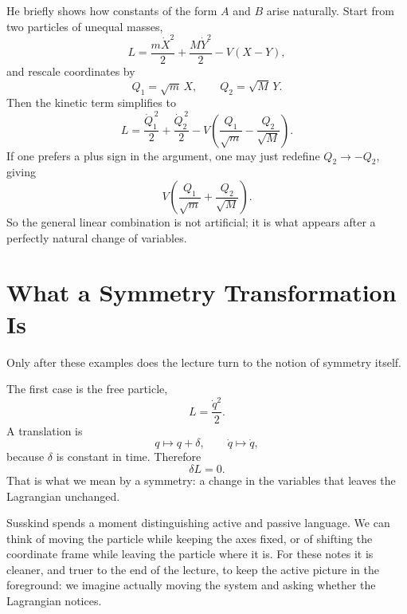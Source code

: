 He briefly shows how constants of the form \(A\) and \(B\) arise naturally. Start from two particles of unequal masses,
\begin{equation}
L=\frac{m\dot X^2}{2}+\frac{M\dot Y^2}{2}-V(X-Y),
\end{equation}
and rescale coordinates by
\begin{equation}
Q_1=\sqrt m\,X,
\qquad
Q_2=\sqrt M\,Y.
\end{equation}
Then the kinetic term simplifies to
\begin{equation}
L=\frac{\dot Q_1^{\,2}}{2}+\frac{\dot Q_2^{\,2}}{2}
-
V\!\left(\frac{Q_1}{\sqrt m}-\frac{Q_2}{\sqrt M}\right).
\end{equation}
If one prefers a plus sign in the argument, one may just redefine \(Q_2\to -Q_2\), giving
\begin{equation}
V\!\left(\frac{Q_1}{\sqrt m}+\frac{Q_2}{\sqrt M}\right).
\end{equation}
So the general linear combination is not artificial; it is what appears after a perfectly natural change of variables.

\section{What a Symmetry Transformation Is}

Only after these examples does the lecture turn to the notion of symmetry itself.

The first case is the free particle,
\begin{equation}
L=\frac{\dot q^2}{2}.
\end{equation}
A translation is
\begin{equation}
q\mapsto q+\delta,
\qquad
\dot q\mapsto \dot q,
\end{equation}
because \(\delta\) is constant in time. Therefore
\begin{equation}
\delta L=0.
\end{equation}
That is what we mean by a symmetry: a change in the variables that leaves the Lagrangian unchanged.

Susskind spends a moment distinguishing active and passive language. We can think of moving the particle while keeping the axes fixed, or of shifting the coordinate frame while leaving the particle where it is. For these notes it is cleaner, and truer to the end of the lecture, to keep the active picture in the foreground: we imagine actually moving the system and asking whether the Lagrangian notices.

